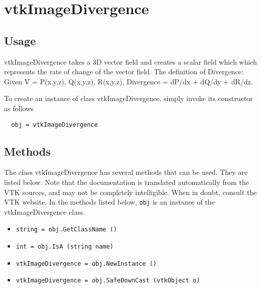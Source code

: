 \section{vtkImageDivergence}

\subsection{Usage}

 vtkImageDivergence takes a 3D vector field 
 and creates a scalar field which 
 which represents the rate of change of the vector field.
 The definition of Divergence:
 Given V = P(x,y,z), Q(x,y,z), R(x,y,z),
 Divergence = dP/dx + dQ/dy + dR/dz.

To create an instance of class vtkImageDivergence, simply
invoke its constructor as follows
\begin{verbatim}
  obj = vtkImageDivergence
\end{verbatim}
\subsection{Methods}

The class vtkImageDivergence has several methods that can be used.
  They are listed below.
Note that the documentation is translated automatically from the VTK sources,
and may not be completely intelligible.  When in doubt, consult the VTK website.
In the methods listed below, \verb|obj| is an instance of the vtkImageDivergence class.
\begin{itemize}
\item  \verb|string = obj.GetClassName ()|

\item  \verb|int = obj.IsA (string name)|

\item  \verb|vtkImageDivergence = obj.NewInstance ()|

\item  \verb|vtkImageDivergence = obj.SafeDownCast (vtkObject o)|

\end{itemize}
